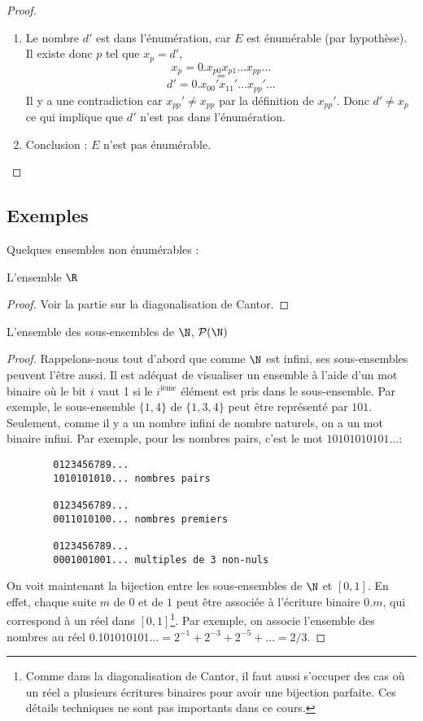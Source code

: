 \begin{myexem}
\begin{mytheo}
\begin{proof}
\begin{enumerate}
			\item Le nombre $d'$ est dans l'énumération, car $E$ est
				énumérable (par hypothèse). Il existe donc $p$ tel que $x_p=d'$,
				\[ x_p=0.x_{p0}x_{p1}\dots x_{pp}\dots \]
				\[=\]
				\[ d'=0.x_{00}'x_{11}'\dots x_{pp}'\dots \]
				Il y a une contradiction car $x_{pp}' \neq
			       	x_{pp}$ par la définition de $x_{pp}'$. Donc $d' \neq x_p$ ce qui implique que $d'$ n'est pas
				dans l'énumération.
			\item Conclusion : $E$ n'est pas énumérable.
		\end{enumerate}
	\end{proof}
\end{mytheo}

\subsection{Exemples}
\label{subsec:exemples_non_enum}

Quelques ensembles non énumérables :
\begin{myexem}
 L'ensemble $\R$
 \begin{proof}
   Voir la partie sur la diagonalisation de Cantor.
 \end{proof}
\end{myexem}

\begin{myexem}
 L'ensemble des sous-ensembles de $\N$, $\mathcal{P}(\N)$
 \begin{proof}
   Rappelons-nous tout d'abord que comme $\N$ est infini, ses sous-ensembles peuvent l'être aussi.
   Il est adéquat de visualiser un ensemble à l'aide d'un mot binaire
   où le bit $i$ vaut 1 si le $i^{\mathrm{ième}}$ élément est pris dans le sous-ensemble.
   Par exemple, le sous-ensemble $\{1,4\}$ de $\{1,3,4\}$ peut être représenté par $101$.
   Seulement, comme il y a un nombre infini de nombre naturels, on a un mot binaire infini.
   Par exemple, pour les nombres pairs, c'est le mot $10101010101\ldots$:
   \begin{verbatim}
		0123456789...
		1010101010... nombres pairs

		0123456789...
		0011010100... nombres premiers

		0123456789...
		0001001001... multiples de 3 non-nuls
    \end{verbatim}
   On voit maintenant la bijection entre les sous-ensembles de $\N$ et $[0,1]$.
   En effet, chaque suite $m$ de $0$ et de $1$ peut être associée à l'écriture binaire $0.m$, qui correspond à un réel dans $[0,1]$\footnote{Comme dans la diagonalisation de Cantor, il faut aussi s'occuper des cas où un réel a plusieurs écritures binaires pour avoir une bijection parfaite. Ces détails techniques ne sont pas importants dans ce cours.}. Par exemple, on associe l'ensemble des nombres au réel $0.101010101\ldots = 2^{-1}+2^{-3}+2^{-5}+\ldots = 2/3$.
 \end{proof}
\end{myexem}


\end{myexem}
